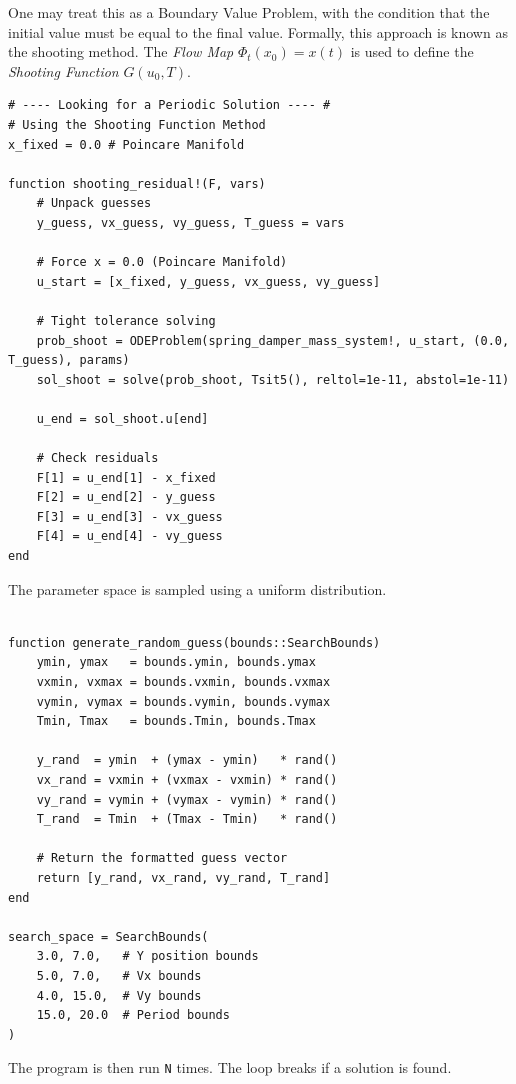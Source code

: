 \documentclass{article}
\begin{document}
One may treat this as a Boundary Value Problem, with the condition that the initial value must be equal to the final value. Formally, this approach is known as the shooting method. The \textit{Flow Map} $\Phi_t(x_0) = x(t)$ is used to define the \textit{Shooting Function} $G(u_0, T)$.
\begin{verbatim}
# ---- Looking for a Periodic Solution ---- #
# Using the Shooting Function Method
x_fixed = 0.0 # Poincare Manifold

function shooting_residual!(F, vars)
    # Unpack guesses
    y_guess, vx_guess, vy_guess, T_guess = vars

    # Force x = 0.0 (Poincare Manifold)
    u_start = [x_fixed, y_guess, vx_guess, vy_guess]

    # Tight tolerance solving
    prob_shoot = ODEProblem(spring_damper_mass_system!, u_start, (0.0, T_guess), params)
    sol_shoot = solve(prob_shoot, Tsit5(), reltol=1e-11, abstol=1e-11)

    u_end = sol_shoot.u[end]

    # Check residuals
    F[1] = u_end[1] - x_fixed
    F[2] = u_end[2] - y_guess
    F[3] = u_end[3] - vx_guess
    F[4] = u_end[4] - vy_guess
end
\end{verbatim}

The parameter space is sampled using a uniform distribution.

\begin{verbatim}

function generate_random_guess(bounds::SearchBounds)
    ymin, ymax   = bounds.ymin, bounds.ymax
    vxmin, vxmax = bounds.vxmin, bounds.vxmax
    vymin, vymax = bounds.vymin, bounds.vymax
    Tmin, Tmax   = bounds.Tmin, bounds.Tmax

    y_rand  = ymin  + (ymax - ymin)   * rand()
    vx_rand = vxmin + (vxmax - vxmin) * rand()
    vy_rand = vymin + (vymax - vymin) * rand()
    T_rand  = Tmin  + (Tmax - Tmin)   * rand()

    # Return the formatted guess vector
    return [y_rand, vx_rand, vy_rand, T_rand]
end

search_space = SearchBounds(
    3.0, 7.0,   # Y position bounds
    5.0, 7.0,   # Vx bounds
    4.0, 15.0,  # Vy bounds
    15.0, 20.0  # Period bounds
)
\end{verbatim}

The program is then run \texttt{N} times. The loop breaks if a solution is found.
\end{document}
